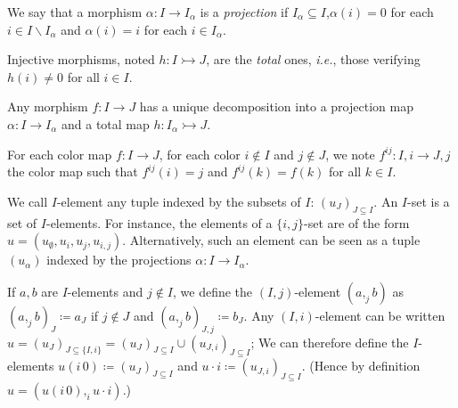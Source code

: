 \documentclass[english]{PaperTools/latex/lipics}
\def\ie{\textit{i.e.}}
\begin{document}
 \begin{definition}[Projection]
    We say that a morphism $α : I → I_α$ is a \emph{projection} if $I_α ⊆ I$,$α(i) = 0$
    for each $i ∈ I \backslash I_α$ and $α(i) = i$ for each $i ∈ I_α$.
  \end{definition}
  \begin{definition}
  Injective morphisms, noted $h : I ↣ J$, are the \emph{total} ones, \ie,
  those verifying $h(i) ≠ 0$ for all $i ∈ I$.
  \end{definition}
  \begin{remark}
  Any morphism $f : I → J$ has a
  unique decomposition into a projection map
  $α : I → I_α$ and a total map $h : I_α ↣ J$.
  \end{remark}

\begin{definition}[$f^{ij}$]
  For each color map $f : I → J$, for each color $i ∉ I$ and $j ∉ J$,
  we note $f^{ij} : I,i → J,j$ the color map such that $f^{ij}(i) = j$
  and $f^{ij}(k) = f(k)$ for all $k ∈ I$.
\end{definition}

\begin{definition}[$I$-set]
  We call $I$-element any tuple indexed by the subsets of $I$: $(u_J)_{J ⊆ I}$.
  An $I$-set is a set of $I$-elements.  For instance, the elements of a
  $\{i,j\}$-set are of the form $u = (u_∅,u_i,u_j,u_{i,j})$.
  Alternatively, such an element can be seen as a tuple $(u_α)$ indexed
  by the projections $α : I → I_α$.
\end{definition}
  If $a,b$ are $I$-elements and $j ∉ I$, we define the $(I,j)$-element
  $(a ,_j b)$ as $(a ,_j b)_J ≔ a_J$ if $j ∉ J$ and $(a ,_j b)_{J,j} ≔ b_J$.
  Any $(I,i)$-element can be written $u = (u_J)_{J ⊆ \{I,i\}} = (u_J)_{J ⊆ I} ∪ (u_{J,i})_{J ⊆ I}$;
  We can therefore define the $I$-elements $u (i\,0) ≔ (u_J)_{J ⊆ I}$ and $u · i ≔ (u_{J,i})_{J ⊆ I}$.
  (Hence by definition $u = (u (i\,0) ,_i u · i)$.)
\end{document}
